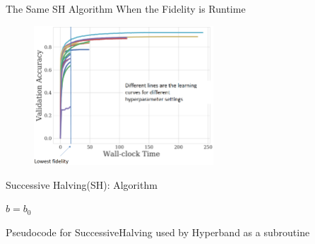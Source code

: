 
\begin{frame}{The Same SH Algorithm When the Fidelity is Runtime}
\vskip -10pt
\hskip 270pt
    
\begin{figure}
    \centering
    \includegraphics[width=0.6\textwidth]{../w07_hpo_speedup/images/hyperband/sh_accuracy_over_time.png}
\end{figure}
    
\end{frame}


\begin{frame}{Successive Halving(SH): Algorithm}
\begin{algorithm}[H]
    \LinesNumbered
    \SetAlgoLined
    \setcounter{AlgoLine}{0}
    \DeclarePairedDelimiter\ceil{\lceil}{\rceil}
    \DeclarePairedDelimiter\floor{\lfloor}{\rfloor}
    \DeclarePairedDelimiter\abs{\lvert}{\rvert}
    
    $b=b_0$\\
    
 
        
    
    \caption*{Pseudocode for SuccessiveHalving used by Hyperband as a subroutine}
\end{algorithm}

\end{frame}

